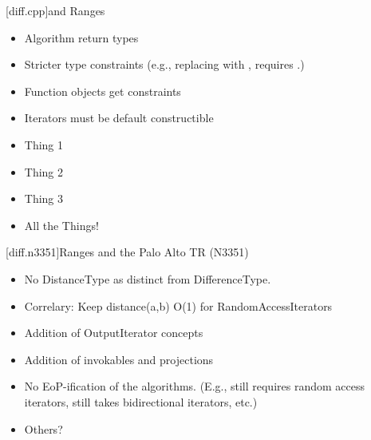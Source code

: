 
[diff.cpp]{\Cpp and Ranges}

\pnum


\begin{itemize}
\item Algorithm return types
\item Stricter type constraints (e.g., replacing  with ,
 requires .)
\item Function objects get constraints
\item Iterators must be default constructible
\item Thing 1
\item Thing 2
\item Thing 3
\item All the Things!
\end{itemize}

[diff.n3351]{Ranges and the Palo Alto TR (N3351)}

\pnum


\begin{itemize}
\item No DistanceType as distinct from DifferenceType.
\item Correlary: Keep distance(a,b) O(1) for RandomAccessIterators
\item Addition of OutputIterator concepts
\item Addition of invokables and projections
\item No EoP-ification of the algorithms. (E.g.,  still requires random access
      iterators,  still takes bidirectional iterators, etc.)
\item Others?
\end{itemize}
